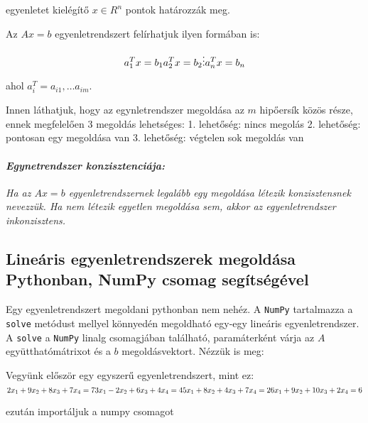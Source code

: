 egyenletet kielégítő \(x \in R^n\) pontok határozzák meg.

    Az \(Ax=b\) egyenletrendszert felírhatjuk ilyen formában is:

    \[ 
a_{1}^Tx= b_1\\
a_{2}^Tx= b_2\\
\vdots\\
a_{n}^Tx= b_n\\
\]

    ahol \(a_{i}^T={a_{i1}, \dots a_{im}}\).

    Innen láthatjuk, hogy az egynletrendszer megoldása az \(m\) hipőersík
közös része, ennek megfelelően 3 megoldás lehetséges: 1. lehetőség:
nincs megolás 2. lehetőség: pontosan egy megoldása van 3. lehetőség:
végtelen sok megoldás van

    \paragraph{\texorpdfstring{\emph{Egynetrendszer
konzisztenciája:}}{Egynetrendszer konzisztenciája:}}\label{egynetrendszer-konzisztenciuxe1ja}

    \emph{Ha az \(Ax=b\) egyenletrendszernek legalább egy megoldása létezik
konzisztensnek nevezzük. Ha nem létezik egyetlen megoldása sem, akkor az
egyenletrendszer inkonzisztens.}

    \subsection{Lineáris egyenletrendszerek megoldása Pythonban, NumPy
csomag
segítségével}\label{lineuxe1ris-egyenletrendszerek-megolduxe1sa-pythonban-numpy-csomag-seguxedtsuxe9guxe9vel}

    Egy egyenletrendszert megoldani pythonban nem nehéz. A \texttt{NumPy}
tartalmazza a \texttt{solve} metódust mellyel könnyedén megoldható
egy-egy lineáris egyenletrendszer. A \texttt{solve} a \texttt{NumPy}
linalg csomagjában található, paramáterként várja az \(A\)
együtthatómátrixot és a \(b\) megoldásvektort. Nézzük is meg:

Vegyünk először egy egyszerű egyenletrendszert, mint ez: \[
    2x_1 + 9x_2 + 8x_3 + 7x_4= 7\\
    3x_1 - 2x_2 + 6x_3 + 4x_4= 4\\
    5x_1 + 8x_2 + 4x_3 + 7x_4= 2\\
    6x_1 + 9x_2 + 10x_3 + 2x_4= 6
\]

ezután importáljuk a numpy csomagot

